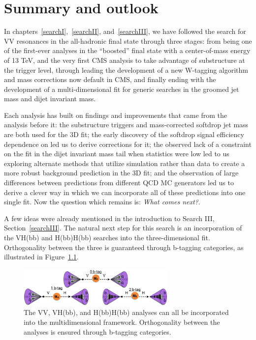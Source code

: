 \chapter{Summary and outlook}
\label{sec:searchIII:outlook}
In chapters~\ref{searchI},~\ref{searchII}, and~\ref{searchIII}, we have followed the search for VV resonances in the all-hadronic final state through three stages: from being one of the first-ever analyses in the ``boosted'' final state with a center-of-mass energy of 13 TeV, and the very first CMS analysis to take advantage of substructure at the trigger level, through leading the development of a new W-tagging algorithm and mass corrections now default in CMS, and finally ending with the development of a multi-dimensional fit for generic searches in the groomed jet mass and dijet invariant mass.\par
Each analysis has built on findings and improvements that came from the analysis before it: the substructure triggers and mass-corrected softdrop jet mass are both used for the 3D fit; the early discovery of the softdrop signal efficiency dependence on \PT led us to derive corrections for it; the observed lack of a constraint on the fit in the dijet invariant mass tail when statistics were low led to us exploring alternate methods that utilize simulation rather than data to create a more robust background prediction in the 3D fit; and the observation of large differences between predictions from different QCD MC generators led us to derive a clever way in which we can incorporate all of these predictions into one single fit. 
Now the question which remains is: \emph{What comes next?}.\par
A few ideas were already mentioned in the introduction to Search III, Section~\ref{searchIII}. The natural next step for this search is an incorporation of the VH(bb) and H(bb)H(bb) searches into the three-dimensional fit. Orthogonality between the three is guaranteed through b-tagging categories, as illustrated in Figure~\ref{fig:outlook:vvvhhh}.
\begin{figure}[h!]
\centering
\includegraphics[width=0.69\textwidth]{figures/analysis/search3/misc/VVVHHH.png}
\caption{The VV, VH(bb), and H(bb)H(bb) analyses can all be incorporated into the multidimensional framework. Orthogonality between the analyses is ensured through b-tagging categories.}
\label{fig:outlook:vvvhhh}
\end{figure}
